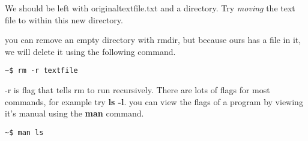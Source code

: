 		We should be left with originaltextfile.txt and a directory. Try \textit{moving} the text file to within this new directory.
		
		you can remove an empty directory with rmdir, but because ours has a file in it, we will delete it using the following command.
		\begin{lstlisting}[style=Terminal]
~$ rm -r textfile
		\end{lstlisting}

		-r is flag that tells rm to run recursively. There are lots of flags for most commands, for example try \textbf{ls -l}. you can view the flags of a program by viewing it's manual using the \textbf{man} command.
		\begin{lstlisting}[style=Terminal]
~$ man ls
		\end{lstlisting}
		
		